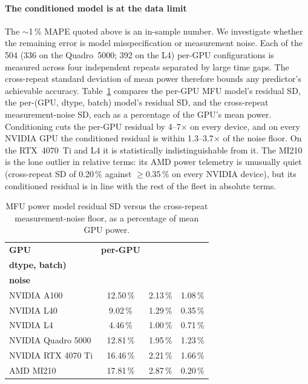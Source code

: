 \documentclass[10pt,conference,letterpaper]{IEEEtran}
\begin{document}
\paragraph{The conditioned model is at the data limit}
The $\sim$1\,\% MAPE quoted above is an in-sample number.
We investigate whether the remaining error is model misspecification or measurement noise.
Each of the 504 (336 on the Quadro~5000; 392 on the L4) per-GPU configurations is measured across four independent repeats separated by large time gaps.
The cross-repeat standard deviation of mean power therefore bounds any predictor's achievable accuracy.
Table~\ref{tab:noise_floor} compares the per-GPU MFU model's residual SD, the per-(GPU, dtype, batch) model's residual SD, and the cross-repeat measurement-noise SD, each as a percentage of the GPU's mean power.
Conditioning cuts the per-GPU residual by 4--7$\times$ on every device, and on every NVIDIA GPU the conditioned residual is within 1.3--3.7$\times$ of the noise floor.
On the RTX~4070~Ti and L4 it is statistically indistinguishable from it.
The MI210 is the lone outlier in relative terms: its AMD power telemetry is unusually quiet (cross-repeat SD of 0.20\,\% against $\geq$0.35\,\% on every NVIDIA device), but its conditioned residual is in line with the rest of the fleet in absolute terms.

\begin{table}[t]
\centering
\caption{MFU power model residual SD versus the cross-repeat measurement-noise floor, as a percentage of mean GPU power.}
\label{tab:noise_floor}
\small
\begin{tabular}{lccc}
    \toprule
    \textbf{GPU} & \textbf{per-GPU} & \makecell{\textbf{per-(GPU,} \\ \textbf{dtype, batch)}} & \makecell{\textbf{Repeat} \\ \textbf{noise}} \\
    \midrule
        NVIDIA A100 & 12.50\,\% & 2.13\,\% & 1.08\,\% \\
        NVIDIA L40 & \phantom{0}9.02\,\% & 1.29\,\% & 0.35\,\% \\
        NVIDIA L4 & \phantom{0}4.46\,\% & 1.00\,\% & 0.71\,\% \\
        NVIDIA Quadro 5000 & 12.81\,\% & 1.95\,\% & 1.23\,\% \\
        NVIDIA RTX 4070 Ti & 16.46\,\% & 2.21\,\% & 1.66\,\% \\
        AMD MI210 & 17.81\,\% & 2.87\,\% & 0.20\,\% \\
    \bottomrule
\end{tabular}
\end{table}
\end{document}
